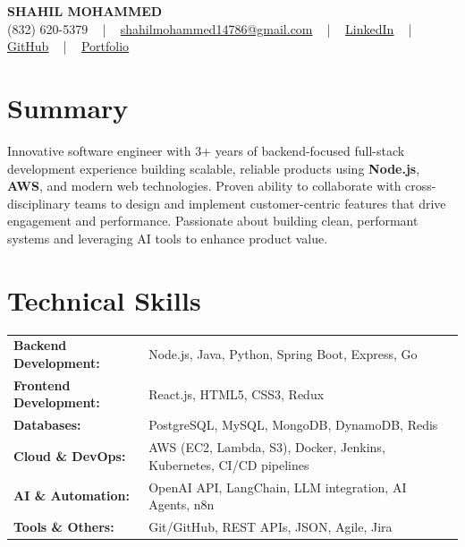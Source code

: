 \documentclass[letterpaper,11pt]{article}
\begin{document}
\begin{center}
    {\fontsize{14pt}{12pt}\selectfont \textbf{\MakeUppercase{Shahil Mohammed}}}\\ \vspace{2pt}
    \fontsize{10pt}{12pt}\selectfont (832) 620-5379 ~ | ~ \href{mailto:shahilmohammed14786@gmail.com}{shahilmohammed14786@gmail.com} ~ | ~  
    \href{https://www.linkedin.com/in/shahil-mohammed-9652931a1/}{\color{blue}\underline{LinkedIn}}  ~ | ~ 
    \href{https://github.com/freakbeast14}{\color{blue}\underline{GitHub}} ~ | ~ 
    \href{https://shahil-mohammed.netlify.app/}{\color{blue}\underline{Portfolio}}
    \vspace{-8pt}
\end{center}

\section{Summary}
\fontsize{9pt}{10pt}\selectfont
Innovative software engineer with 3+ years of backend-focused full-stack development experience building scalable, reliable products using \textbf{Node.js}, \textbf{AWS}, and modern web technologies. Proven ability to collaborate with cross-disciplinary teams to design and implement customer-centric features that drive engagement and performance. Passionate about building clean, performant systems and leveraging AI tools to enhance product value.

 \vspace{-5pt}
 
\section{Technical Skills}
        \vspace{-14pt}
        \begin{table}[h]
            \fontsize{9pt}{10pt}\selectfont
            \begin{tabular}{p{0.3\linewidth} p{0.7\linewidth}}
                \textbf{Backend Development:} & Node.js, Java, Python, Spring Boot, Express, Go \\
                \textbf{Frontend Development:} & React.js, HTML5, CSS3, Redux \\
                \textbf{Databases:} & PostgreSQL, MySQL, MongoDB, DynamoDB, Redis \\
                \textbf{Cloud \& DevOps:} & AWS (EC2, Lambda, S3), Docker, Jenkins, Kubernetes, CI/CD pipelines \\
                \textbf{AI \& Automation:} & OpenAI API, LangChain, LLM integration, AI Agents, n8n \\
                \textbf{Tools \& Others:} & Git/GitHub, REST APIs, JSON, Agile, Jira \\
            \end{tabular}
        \end{table}
 \vspace{-15pt}
 
\end{document}
